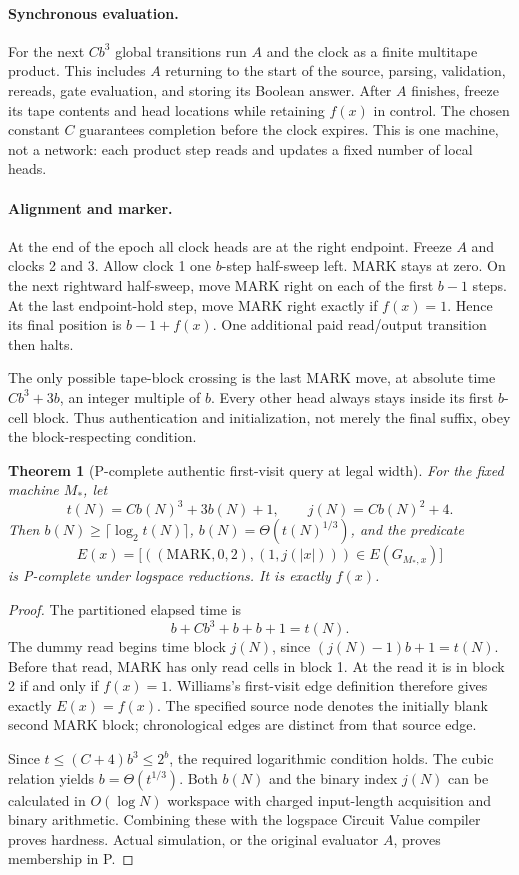 \documentclass[11pt]{article}
\newtheorem{theorem}{Theorem}
\begin{document}
\paragraph{Synchronous evaluation.}
For the next $Cb^3$ global transitions run $A$ and the clock as a finite
multitape product. This includes $A$ returning to the start of the source,
parsing, validation, rereads, gate evaluation, and storing its Boolean
answer. After $A$ finishes, freeze its tape contents and head locations
while retaining $f(x)$ in control. The chosen constant $C$ guarantees
completion before the clock expires. This is one machine, not a network:
each product step reads and updates a fixed number of local heads.

\paragraph{Alignment and marker.}
At the end of the epoch all clock heads are at the right endpoint.
Freeze $A$ and clocks 2 and 3. Allow clock 1 one $b$-step half-sweep left.
MARK stays at zero. On the next rightward half-sweep, move MARK right on
each of the first $b-1$ steps. At the last endpoint-hold step, move MARK
right exactly if $f(x)=1$. Hence its final position is $b-1+f(x)$.
One additional paid read/output transition then halts.

The only possible tape-block crossing is the last MARK move, at absolute
time $Cb^3+3b$, an integer multiple of $b$. Every other head always stays
inside its first $b$-cell block. Thus authentication and initialization,
not merely the final suffix, obey the block-respecting condition.

\begin{theorem}[P-complete authentic first-visit query at legal width]
For the fixed machine $M_*$, let
\[
t(N)=Cb(N)^3+3b(N)+1,\qquad j(N)=Cb(N)^2+4.
\]
Then $b(N)\geq\lceil\log_2t(N)\rceil$, $b(N)=\Theta(t(N)^{1/3})$,
and the predicate
\[
E(x)=\bigl[((\mathrm{MARK},0,2),(1,j(|x|)))
           \in E(G_{M_*,x})\bigr]
\]
is P-complete under logspace reductions. It is exactly $f(x)$.
\end{theorem}
\begin{proof}
The partitioned elapsed time is
\[
b+Cb^3+b+b+1=t(N).
\]
The dummy read begins time block $j(N)$, since
$(j(N)-1)b+1=t(N)$. Before that read, MARK has only read cells in
block 1. At the read it is in block 2 if and only if $f(x)=1$.
Williams's first-visit edge definition therefore gives exactly $E(x)=f(x)$.
The specified source node denotes the initially blank second MARK block;
chronological edges are distinct from that source edge.

Since $t\leq(C+4)b^3\leq2^b$, the required logarithmic condition holds.
The cubic relation yields $b=\Theta(t^{1/3})$.
Both $b(N)$ and the binary index $j(N)$ can be calculated in $O(\log N)$
workspace with charged input-length acquisition and binary arithmetic.
Combining these with the logspace Circuit Value compiler proves hardness.
Actual simulation, or the original evaluator $A$, proves membership in P.
\end{proof}
\end{document}
